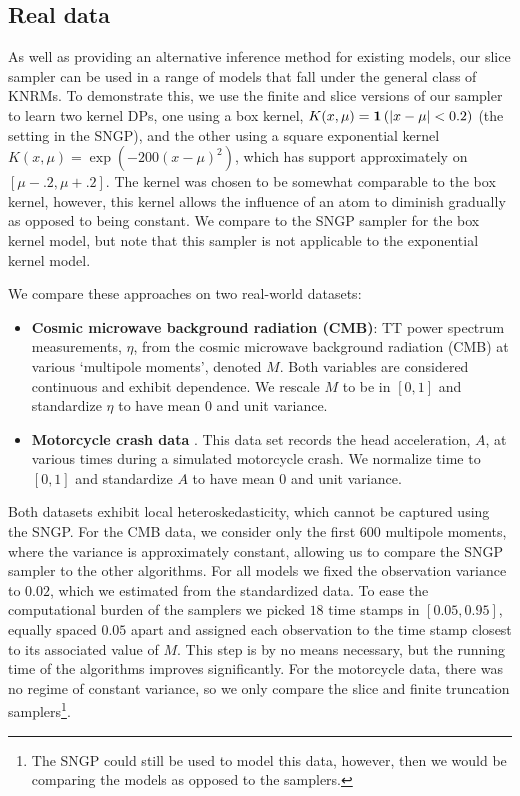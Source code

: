 \subsection{Real data}
As well as providing an alternative inference method for existing models, our slice sampler can be used in a range of models that fall under the general class of KNRMs. To demonstrate this, we use the finite and slice versions of our sampler to learn two kernel DPs, one using a box kernel, $K(x,\mu) =
\mathbf 1 \left ( |x-\mu| < 0.2 \right )$ (the setting in the SNGP), and the other using a square exponential kernel $K(x,\mu) = \exp(-200(x-\mu)^2)$, which has support
approximately on $[\mu-.2,\mu+.2]$.  The kernel was chosen to be somewhat
comparable to the box kernel, however, this kernel allows the influence of an
atom to diminish gradually as opposed to being constant. We compare to the SNGP sampler for the box kernel model, but note that this sampler is not applicable to the exponential kernel model.

We compare these approaches on two real-world datasets:
\begin{itemize}
  \item \textbf{Cosmic microwave background radiation (CMB)}\cite{Bennett:2003}: TT power spectrum measurements, $\eta$, from
the cosmic microwave background radiation (CMB) at various `multipole moments',
denoted $M$.  Both variables are
considered continuous and exhibit dependence.
We rescale $M$ to be in $[0,1]$ and standardize $\eta$ to have mean $0$ and
unit variance.
\item \textbf{Motorcycle crash data} \cite{Silverman:1985}.  This data set records the head acceleration, $A$, at various times
during a simulated motorcycle crash. We normalize time to $[0,1]$ and standardize $A$ to have
mean $0$ and unit variance.
\end{itemize}

Both datasets exhibit local heteroskedasticity, which cannot be captured using
the SNGP. For the CMB data, we consider only the first $600$ multipole moments, where the variance is approximately constant, allowing us to compare the SNGP sampler to the other algorithms. For all models we fixed the observation
variance to $0.02$, which we estimated from the standardized data.  To ease the 
computational burden of the samplers we picked $18$ time stamps in $[0.05,0.95]$,
equally spaced $0.05$ apart and assigned each observation to the time stamp
closest to its associated value of $M$.  This step is by no means necessary,
but the running time of the algorithms improves significantly. For the motorcycle data, there was no regime of constant variance, so we only compare the slice and finite
truncation samplers\footnote{The SNGP could still be used to model
this data, however, then we would be comparing the models as opposed to the
samplers.}.

